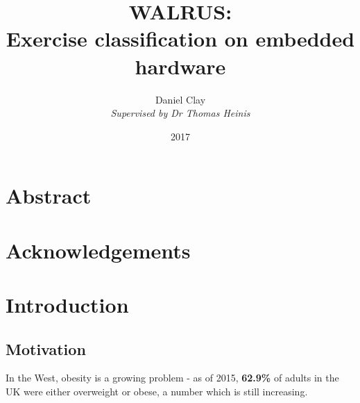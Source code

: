 \documentclass[a4paper]{article}
\begin{document}
\title{\textbf{WALRUS:}\\
Exercise classification on embedded hardware}
\date{2017}
\author{
Daniel Clay\\
\emph{Supervised by Dr Thomas Heinis}\\ 
}
\maketitle
\pagebreak

\section{Abstract}


\section{Acknowledgements}



\pagebreak
\tableofcontents
\pagebreak


\newpage
\section{Introduction}

\subsection{Motivation}%




In the West, obesity is a growing problem - as of 2015, \textbf{62.9\%} of adults in the UK were either overweight or obese, a number which is still increasing.\cite{inref1}
\end{document}
